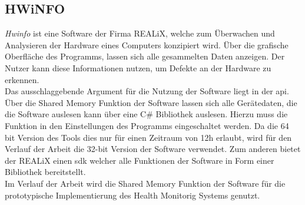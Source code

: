 \subsection{HWiNFO}\label{sec:HWiNFO}
\textit{Hwinfo} ist eine Software der Firma REALiX, welche zum Überwachen und Analysieren der Hardware eines Computers konzipiert wird. Über die grafische Oberfläche des Programms, lassen sich alle gesammelten Daten anzeigen. Der Nutzer kann diese Informationen nutzen, um Defekte an der Hardware zu erkennen.\\
Das ausschlaggebende Argument für die Nutzung der Software liegt in der \ac{api}. Über die Shared Memory Funktion der Software lassen sich alle Gerätedaten, die die Software auslesen kann über eine C\# Bibliothek auslesen. Hierzu muss die Funktion in den Einstellungen des Programms eingeschaltet werden. Da die 64 bit Version des Tools dies nur für einen Zeitraum von 12h erlaubt, wird für den Verlauf der Arbeit die 32-bit Version der Software verwendet. Zum anderen bietet der REALiX einen \ac{sdk} welcher alle Funktionen der Software in Form einer Bibliothek bereitstellt.\cite{HWINFO}\\
Im Verlauf der Arbeit wird die Shared Memory Funktion der Software für die prototypische Implementierung des Health Monitorig Systems genutzt.   